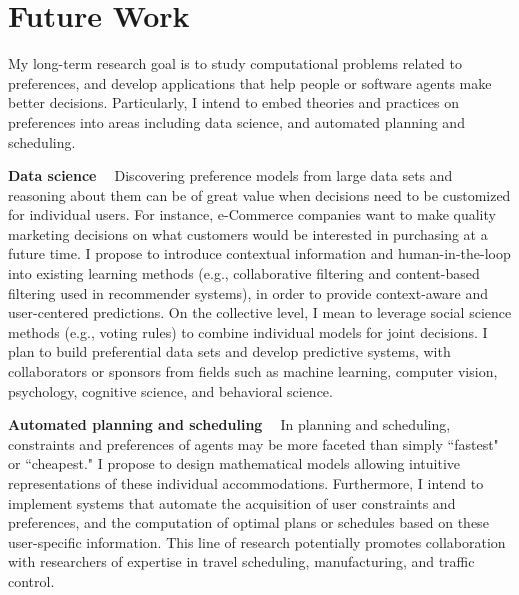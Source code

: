 \section{Future Work}

My long-term research goal is to study computational problems related to preferences, and 
develop applications that help people or software agents make better decisions.
Particularly, I intend to embed theories and practices on preferences into areas including
data science, and automated planning and scheduling.

\smallskip \noindent \textbf{Data science \  } Discovering preference 
models from large data sets and reasoning about them 
can be of great value when decisions need to be customized for individual users.
For instance, e-Commerce companies want to make quality marketing decisions
on what customers would be interested in purchasing at a future time.
I propose to introduce contextual information and human-in-the-loop into existing learning methods
(e.g., collaborative filtering and content-based filtering used in recommender systems), 
in order to provide context-aware and user-centered predictions.
On the collective level, I mean to leverage social science methods (e.g., voting rules)
to combine individual models for joint decisions.
I plan to build preferential data sets and develop predictive systems, with collaborators
or sponsors from fields 
such as machine learning, computer vision, psychology, cognitive science, and behavioral science.

\smallskip \noindent \textbf{Automated planning and scheduling \  }
In planning and scheduling, constraints and preferences of agents may be more faceted than simply
``fastest" or ``cheapest."
I propose to design mathematical models allowing
intuitive representations of these individual accommodations. 
Furthermore, I intend to implement systems
that automate the acquisition of user constraints and preferences, 
and the computation of optimal plans or schedules 
based on these user-specific information.
This line of research potentially promotes collaboration with researchers of expertise in
travel scheduling, manufacturing, and traffic control.
